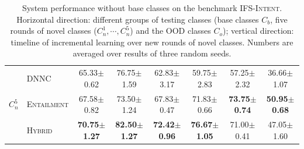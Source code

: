 \documentclass[11pt]{article}
\newcommand{\modelname}{\textsc{Entailment}}
\newcommand{\hybrid}{\textsc{Hybrid}}
\newcommand{\intentdata}{\textsc{IFS-Intent}}
\begin{document}
\begin{table}[t]
\begin{tabular}{ll|c|c|c|c|c|c}
   \multirow{3}{*}{$C_n^5$} &  DNNC &65.33$\pm$0.62 & 76.75$\pm$1.59& 62.83$\pm$3.17&59.75$\pm$2.83 &57.25$\pm$2.32 & 36.66$\pm$1.07\\
   &  \modelname &67.58$\pm$0.82 & 73.50$\pm$1.24& 67.83$\pm$0.47& 71.83$\pm$0.66& \textbf{73.75$\pm$0.74}&\textbf{50.95$\pm$0.68} \\
  &  \hybrid &\textbf{70.75$\pm$1.27} &\textbf{82.50$\pm$1.27} & \textbf{72.42$\pm$0.96}&\textbf{76.67$\pm$1.05} & 71.00$\pm$0.41& 47.05$\pm$1.60\\\hline
\end{tabular}
\caption{System performance without base classes on the benchmark \intentdata. Horizontal direction: different groups of testing classes (base classes $C_b$, five rounds of novel classes ($C_n^1, \cdots, C_n^5$) and the OOD classes $C_o$); vertical direction: timeline of incremental learning over new rounds of novel classes.  Numbers are averaged over results of three random seeds.}\label{tab:intentresults_withoutbase}
\end{table}
\end{document}
